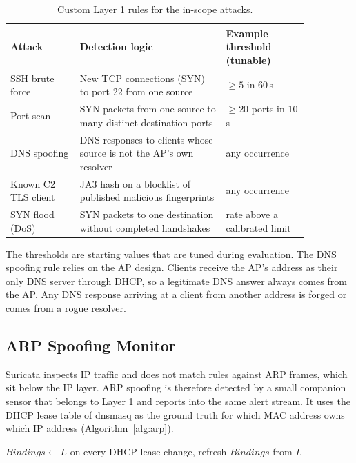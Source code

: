 \begin{table}[H]
\centering
\caption{Custom Layer 1 rules for the in-scope attacks.}
\label{tab:customrules}
\begin{tabular}{|>{\raggedright\arraybackslash}p{0.2\linewidth}|>{\raggedright\arraybackslash}p{0.42\linewidth}|>{\raggedright\arraybackslash}p{0.24\linewidth}|}
\hline
\textbf{Attack} & \textbf{Detection logic} & \textbf{Example threshold (tunable)} \\
\hline
SSH brute force & New TCP connections (SYN) to port 22 from one source & $\geq 5$ in 60\,s \\
\hline
Port scan & SYN packets from one source to many distinct destination ports & $\geq 20$ ports in 10\,s \\
\hline
DNS spoofing & DNS responses to clients whose source is not the AP's own resolver & any occurrence \\
\hline
Known C2 TLS client & JA3 hash on a blocklist of published malicious fingerprints & any occurrence \\
\hline
SYN flood (DoS) & SYN packets to one destination without completed handshakes & rate above a calibrated limit \\
\hline
\end{tabular}
\end{table}

\noindent The thresholds are starting values that are tuned during evaluation. The DNS spoofing rule relies on the AP design. Clients receive the AP's address as their only DNS server through DHCP, so a legitimate DNS answer always comes from the AP. Any DNS response arriving at a client from another address is forged or comes from a rogue resolver.

\subsection{ARP Spoofing Monitor}\label{sec:5.4.3}
\label{sec:arp}
\noindent Suricata inspects IP traffic and does not match rules against ARP frames, which sit below the IP layer. ARP spoofing is therefore detected by a small companion sensor that belongs to Layer 1 and reports into the same alert stream. It uses the DHCP lease table of dnsmasq as the ground truth for which MAC address owns which IP address (Algorithm~\ref{alg:arp}).

\begin{algorithm}[H]
\caption{ARP consistency check}
\label{alg:arp}
$Bindings \leftarrow L$ 
on every DHCP lease change, refresh $Bindings$ from $L$\;
\end{algorithm}

